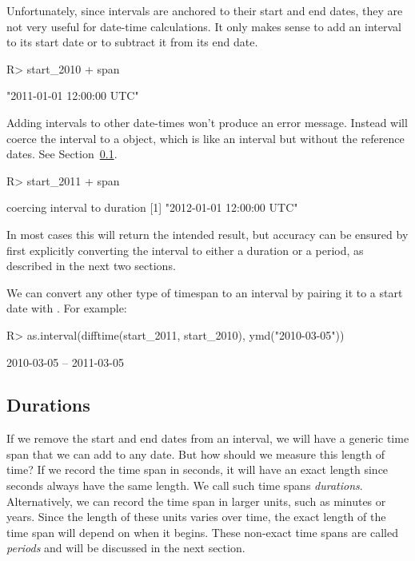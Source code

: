 \documentclass[article]{jss}
\begin{document}
Unfortunately, since intervals are anchored to their start and end dates, they are not very useful for date-time calculations. It only makes sense to add an interval to its start date or to subtract it from its end date.

\begin{CodeInput}
R> start_2010 + span
\end{CodeInput}
\begin{CodeOutput}
[1] "2011-01-01 12:00:00 UTC"
\end{CodeOutput}

Adding intervals to other date-times won't produce an error message. Instead  will coerce the interval to a  object, which is like an interval but without the reference dates. See Section~\ref{sec:durations}.

\begin{CodeInput}
R> start_2011 + span
\end{CodeInput}
\begin{CodeOutput}
coercing interval to duration
[1] "2012-01-01 12:00:00 UTC"
\end{CodeOutput}

In most cases this will return the intended result, but accuracy can be ensured by first explicitly converting the interval to either a duration or a period, as described in the next two sections.

We can convert any other type of timespan to an interval by pairing it to a start date with . For example:

\begin{CodeInput}
R> as.interval(difftime(start_2011, start_2010), ymd("2010-03-05"))
\end{CodeInput}
\begin{CodeOutput}
[1] 2010-03-05 -- 2011-03-05
\end{CodeOutput}

\subsection{Durations}
\label{sec:durations}

If we remove the start and end dates from an interval, we will have a generic time span that we can add to any date. But how should we measure this length of time? If we record the time span in seconds, it will have an exact length since seconds always have the same length. We call such time spans \emph{durations}. Alternatively, we can record the time span in larger units, such as minutes or years. Since the length of these units varies over time, the exact length of the time span will depend on when it begins. These non-exact time spans are called \emph{periods} and will be discussed in the next section.
\end{document}
